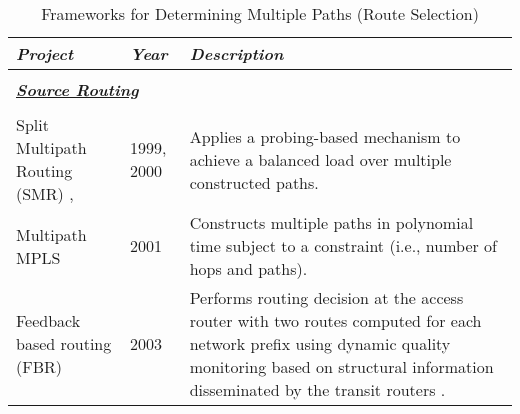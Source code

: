\documentclass[10pt]{IEEEtran}
\begin{document}
\begin{table*}[!ht]
\centering
\ssmall
\caption{Frameworks for Determining Multiple Paths (Route Selection)}
\label{tab:Determining_Routes}
\begin{tabular}{p{5.5cm}p{1cm}p{10cm}}
\hline

\cellcolor[HTML]{EFEFEF}\textbf{\textit{Project}}
& \cellcolor[HTML]{EFEFEF}\textbf{\textit{Year}} &
\cellcolor[HTML]{EFEFEF}\textbf{\textit{Description}}  \\
\hline

\\
\multicolumn{2}{l}{\textbf{\underline{\emph{Source Routing}}}}\\
\\

Split Multipath Routing (SMR) \cite{nasipuri1999demand}, \cite{wang2000multipath} & 1999, 2000 & Applies a probing-based mechanism to achieve a balanced load over multiple constructed paths. \\

Multipath MPLS \cite{seok2001dynamic} & 2001 & Constructs multiple paths in polynomial time subject to a constraint (i.e., number of hops and paths). \\

Feedback based routing (FBR)  \cite{zhu2003feedback} & 2003 & Performs routing decision at the access router with two routes computed for each network prefix using dynamic quality monitoring based on structural information disseminated by the transit routers .\\


\end{tabular}
\end{table*}
\end{document}
